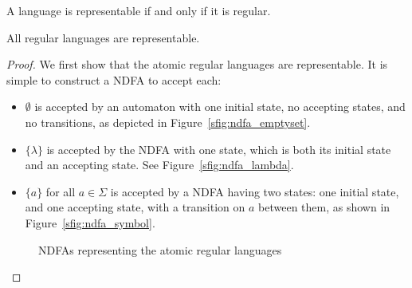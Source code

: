 \documentclass{bcthesis}
\begin{document}
\label{ch:kleenes_theorem}

	\begin{theorem}
		A language is representable if and only if it is regular.
	\end{theorem}

	\begin{claim}
	\label{prop:regular_languages_representable}
		All regular languages are representable.
	\end{claim}
	\begin{proof}
		We first show that the atomic regular languages are representable.
		It is simple to construct a NDFA to accept each:
		\begin{itemize}
			\item [] $\emptyset$ is accepted by an automaton with one initial state, no accepting states, and no transitions, as depicted in Figure~\ref{sfig:ndfa_emptyset}.
			\item [] $\{ \lambda \}$ is accepted by the NDFA with one state, which is both its initial state and an accepting state. See Figure~\ref{sfig:ndfa_lambda}.
			\item [] $\{ a \}$ for all $a \in \Sigma$ is accepted by a NDFA having two states: one initial state, and one accepting state, with a transition on $a$ between them, as shown in Figure~\ref{sfig:ndfa_symbol}.
		\end{itemize}


		\begin{figure}[H]
			\centering
			\setlength{\fboxrule}{0 pt}
			\caption{NDFAs representing the atomic regular languages}
			\label{fig:ndfa_atomic_regular_languages}
		\end{figure}


\end{proof}
\end{document}
